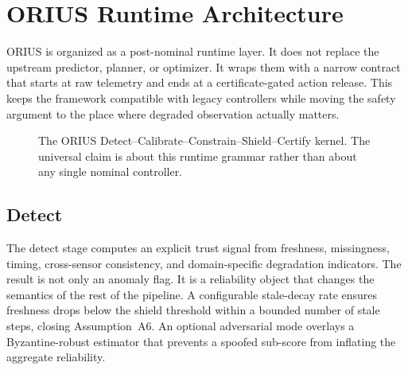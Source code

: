 \section{ORIUS Runtime Architecture}
\label{sec:ieee-runtime}

ORIUS is organized as a post-nominal runtime layer. It does not replace the upstream
predictor, planner, or optimizer. It wraps them with a narrow contract that starts at
raw telemetry and ends at a certificate-gated action release. This keeps the framework
compatible with legacy controllers while moving the safety argument to the place where
degraded observation actually matters.

\begin{figure}[t]
\centering
{}
\caption{The ORIUS Detect--Calibrate--Constrain--Shield--Certify kernel. The universal claim is about this runtime grammar rather than about any single nominal controller.}
\label{fig:ieee-runtime-kernel}
\end{figure}

\subsection{Detect}
The detect stage computes an explicit trust signal from freshness, missingness, timing,
cross-sensor consistency, and domain-specific degradation indicators. The result is not
only an anomaly flag. It is a reliability object that changes the semantics of the rest
of the pipeline.  A configurable stale-decay rate ensures freshness drops below the
shield threshold within a bounded number of stale steps, closing Assumption~A6.  An
optional adversarial mode overlays a Byzantine-robust estimator that prevents a spoofed
sub-score from inflating the aggregate reliability.

